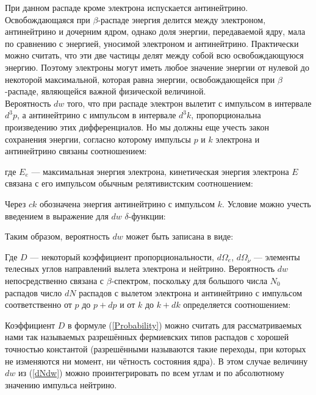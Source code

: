 При данном распаде кроме электрона испускается антинейтрино. Освобождающаяся при
$ \beta $-распаде энергия делится между электроном, антинейтрино и дочерним ядром,
однако доля энергии, передаваемой ядру, мала по сравнению с энергией,
уносимой электроном и антинейтрино. Практически можно считать, что эти две
частицы делят между собой всю освобождающуюся энергию. Поэтому электроны могут
иметь любое значение энергии  от нулевой до некоторой максимальной, которая
равна энергии, освобождающейся при $ \beta $-распаде, являющейся важной физической
величиной. \\

Вероятность $ dw $ того, что при распаде электрон вылетит с импульсом в
интервале $ d^3p $, а антинейтрино с импульсом в интервале $ d^3k $, пропорциональна
произведению этих дифференциалов. Но мы должны еще учесть закон сохранения
энергии, согласно которому импульсы $ p $ и $ k $ электрона и антинейтрино
связаны соотношением:


где $ E_e $ --- максимальная энергия электрона, кинетическая энергия электрона
$ E $ связана с его импульсом обычным релятивистским соотношением:


Через $ ck $ обозначена энергия антинейтрино с импульсом $ k $. Условие можно
учесть введением в выражение для $ dw $ $ \delta $-функции:


Таким образом, вероятность $ dw $ может быть записана в виде:


Где $ D $ --- некоторый коэффициент пропорциональности, $ d\Omega_e $,
$ d\Omega_{\widetilde{\nu}} $ --- элементы телесных углов направлений вылета
электрона и нейтрино. Вероятность $ dw $ непосредственно связана с
$ \beta $-спектром, поскольку для большого числа $ N_0 $ распадов число $ dN $
распадов с вылетом электрона и антинейтрино с импульсом соответственно от $ p $
до $ p + dp $ и от $ k $ до $ k + dk $ определяется соотношением:


\newpage

Коэффициент $ D $ в формуле (\ref{Probability}) можно считать для рассматриваемых нами
так называемых разрешённых фермиевских типов распадов с хорошей точностью
константой (разрешёнными называются такие переходы, при которых не изменяются ни
момент, ни чётность состояния ядра). В этом случае величину $ dw $ из
(\ref{dNdw}) можно проинтегрировать по всем углам и по абсолютному значению
импульса нейтрино. \\

